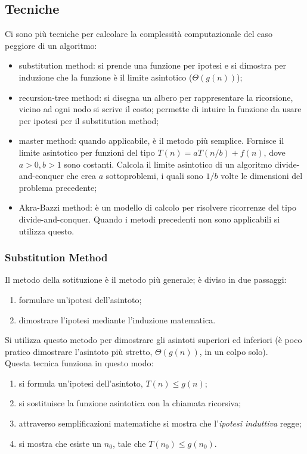 \documentclass{article}
\begin{document}
\subsection{Tecniche}
Ci sono più tecniche per calcolare la complessità computazionale del caso
peggiore di un algoritmo:
\begin{itemize}
    \item substitution method: si prende una funzione per ipotesi e si dimostra
        per induzione che la funzione è il limite asintotico ($\Theta(g(n))$);
    \item recursion-tree method: si disegna un albero per rappresentare la
        ricorsione, vicino ad ogni nodo si scrive il costo; permette di intuire
        la funzione da usare per ipotesi per il substitution method;
    \item master method: quando applicabile, è il metodo più semplice. Fornisce
        il limite asintotico per funzioni del tipo $T(n) = aT(n/b) + f(n)$, dove
        $a>0, b>1$ sono costanti. Calcola il limite asintotico di un algoritmo
        divide-and-conquer che crea $a$ sottoproblemi, i quali sono $1/b$ volte
        le dimensioni del problema precedente;
    \item Akra-Bazzi method: è un modello di calcolo per risolvere ricorrenze
        del tipo divide-and-conquer. Quando i metodi precedenti non sono
        applicabili si utilizza questo.
\end{itemize}

\subsubsection{Substitution Method}
Il metodo della sotituzione è il metodo più generale; è diviso in due passaggi:
\begin{enumerate}
    \item formulare un'ipotesi dell'asintoto;
    \item dimostrare l'ipotesi mediante l'induzione matematica.
\end{enumerate}

Si utilizza questo metodo per dimostrare gli asintoti superiori ed inferiori (è
poco pratico dimostrare l'asintoto più stretto, $\Theta(g(n))$, in un colpo
solo).\\
Questa tecnica funziona in questo modo:
\begin{enumerate}
    \item si formula un'ipotesi dell'asintoto, $T(n) \leq g(n)$;
    \item si sostituisce la funzione asintotica con la chiamata ricorsiva;
    \item attraverso semplificazioni matematiche si mostra che l'\textit{ipotesi
        induttiva} regge;
    \item si mostra che esiste un $n_0$, tale che $T(n_0) \leq g(n_0)$.
\end{enumerate}
\end{document}
